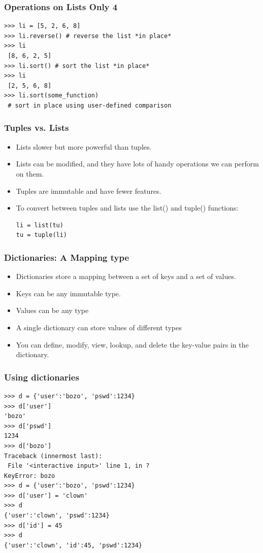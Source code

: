\documentclass[12pt,handout]{beamer}
\begin{document}
\begin{frame}[fragile]
\frametitle{Operations on Lists Only 4}
\small{
\begin{verbatim}
>>> li = [5, 2, 6, 8]
>>> li.reverse() # reverse the list *in place*
>>> li
 [8, 6, 2, 5]
>>> li.sort() # sort the list *in place*
>>> li
 [2, 5, 6, 8]
>>> li.sort(some_function)
 # sort in place using user-defined comparison
\end{verbatim}
}
\end{frame}

\begin{frame}[fragile]
\frametitle{Tuples vs. Lists}
\begin{itemize}
\item Lists slower but more powerful than tuples.
\item Lists can be modified, and they have lots of handy operations we can
perform on them.
\item Tuples are immutable and have fewer features.
\item To convert between tuples and lists use the list() and tuple()
functions:
\small{
\begin{verbatim}
li = list(tu)
tu = tuple(li)
\end{verbatim}
}
\end{itemize}
\end{frame}

\begin{frame}[fragile]
\frametitle{Dictionaries: A Mapping type}
\begin{itemize}
\item Dictionaries store a mapping between a set of keys
and a set of values.
\item Keys can be any immutable type.
\item Values can be any type
\item A single dictionary can store values of different types
\item You can define, modify, view, lookup, and delete
the key-value pairs in the dictionary.
\end{itemize}
\end{frame}


\begin{frame}[fragile]
\frametitle{Using dictionaries}
\small{
\begin{verbatim}
>>> d = {'user':'bozo', 'pswd':1234}
>>> d['user'] 
'bozo'
>>> d['pswd']
1234
>>> d['bozo']
Traceback (innermost last):
 File '<interactive input>' line 1, in ?
KeyError: bozo
>>> d = {'user':'bozo', 'pswd':1234}
>>> d['user'] = 'clown'
>>> d
{'user':'clown', 'pswd':1234}
>>> d['id'] = 45
>>> d
{'user':'clown', 'id':45, 'pswd':1234}
\end{verbatim}
}
\end{frame}
\end{document}
